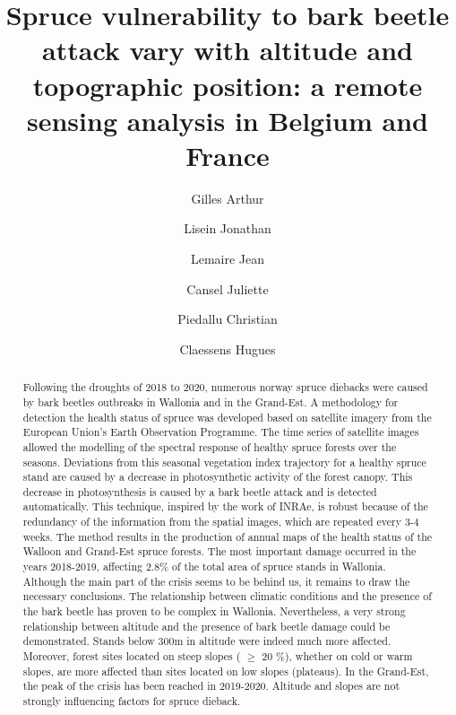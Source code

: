 \documentclass[3p,procedia]{elsarticle}
\begin{document}
\begin{frontmatter}

\author[label1]{Gilles Arthur}
\author[label1]{Lisein Jonathan}
\author[label2]{Lemaire Jean}
\author[label2]{Cansel Juliette}
\author[label3]{Piedallu Christian}
\author[label1]{Claessens Hugues}




\title{Spruce vulnerability to bark beetle attack vary with altitude and topographic position: a remote sensing analysis in Belgium and France}
\begin{abstract}
	
\iffalse
Following the droughts of 2018 to 2020, numerous norway spruce diebacks were caused by bark beetles 
outbreaks in Wallonia and in the Grand-Est. 
A methodology for detection the health status of spruce was developed based on satellite imagery from the European Union's Earth Observation Programme.
The time series of satellite images allowed the modelling of the spectral response of healthy spruce forests over the seasons. Deviations from this seasonal vegetation index trajectory for a healthy spruce stand are caused by a decrease in photosynthetic activity of the forest canopy.
This decrease in photosynthesis is caused by a bark beetle attack and is detected automatically.
This technique, inspired by the work of INRAe, is robust because of the redundancy of the information from the spatial images, which are repeated every 3-4 weeks. 
The method results in the production of annual maps of the health status of the Walloon and Grand-Est spruce forests.
The most important damage occurred in the years 2018-2019, affecting 2.8\% of the total area of spruce stands in Wallonia.
Although the main part of the crisis seems to be behind us, it remains to draw the necessary conclusions.
The relationship between climatic conditions and the presence of the bark beetle has proven to be complex in Wallonia.
Nevertheless, a very strong relationship between altitude and the presence of bark beetle damage could be demonstrated.
Stands below 300m in altitude were indeed much more affected.
Moreover, forest sites located on steep slopes ( $\ge$  20 \%), whether on cold or warm slopes, are more affected than sites located on low slopes (plateaus).
In the Grand-Est, the peak of the crisis has been reached in 2019-2020. Altitude and slopes are not strongly influencing factors for spruce dieback. 


\end{abstract}
\end{frontmatter}
\end{document}
